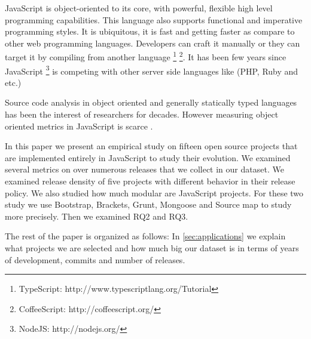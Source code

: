 
JavaScript is object-oriented to its core, with powerful, flexible high level programming capabilities. This language also supports functional and imperative programming styles. It is ubiquitous, it is fast and getting faster as compare to other web programming languages. Developers can craft it manually or they can target it by compiling from another language \footnote{TypeScript: http://www.typescriptlang.org/Tutorial} \footnote{CoffeeScript: http://coffeescript.org/}. It has been few years since JavaScript \footnote{NodeJS: http://nodejs.org/} is competing with other server side languages like (PHP, Ruby and etc.)

Source code analysis in object oriented and generally statically typed languages has been the interest of researchers for decades. However measuring object oriented metrics in JavaScript is scarce \cite{Richards:2010:ADB:1809028.1806598} \cite{6320536}.


In this paper we present an empirical study on fifteen open source projects that are implemented entirely in JavaScript to study their evolution. We examined several metrics on over numerous releases that we collect in our dataset. We examined release density of five projects with different behavior in their release policy. We also studied how much modular are JavaScript projects. For these two study we use Bootstrap, Brackets, Grunt, Mongoose and Source map to study more precisely.
 Then we examined RQ2 and RQ3.

The rest of the paper is organized as follows: In \ref{sec:applications} we explain what projects we are selected and how much big our dataset is in terms of years of development, commits and number of releases.

